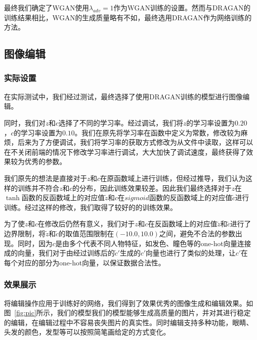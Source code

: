 \documentclass[a4paper,12pt,UTF8]{ctexart}
\begin{document}
最终我们确定了WGAN使用$\lambda_{adv}=1$作为WGAN训练的设置。然而与DRAGAN的训练结果相比，WGAN的生成质量略有不如，最终选用DRAGAN作为网络训练的方法。

\subsection{图像编辑}

\subsubsection{实际设置}

在实际测试中，我们经过测试，最终选择了使用DRAGAN训练的模型进行图像编辑。

同时，我们对$z$和$c$选择了不同的学习率。经过调试，我们将$z$的学习率设置为$0.20$，$c$的学习率设置为$0.10$。我们在原先将学习率在函数中定义为常数，修改较为麻烦，后来为了方便调试，我们将学习率的获取方式修改为从文件中读取，这样可以在不关闭前端的情况下修改学习率进行调试，大大加快了调试速度，最终获得了效果较为优秀的参数。

我们原先的想法是直接对于$z$和$c$在原函数域上进行训练，但经过推导，我们认为这样的训练并不符合$z$和$c$的分布，因此训练效果较差。因此我们最终选择对于$z$在$\tanh$函数的反函数域上的对应值$\tilde z$和$c$在$sigmoid$函数的反函数域上的对应值$\tilde c$进行训练。经过这样的修改，我们取得了较好的的训练效果。

为了使$z$和$c$在修改后仍然有意义，我们对于$z$和$c$在反函数域上的对应值$\tilde z$和$\tilde c$进行了边界限制，将$\tilde z$和$\tilde c$的取值范围限制在$(-10.0, 10.0)$之间，避免不合法的参数出现。同时，因为$c$是由多个代表不同人物特征，如发色、瞳色等的one-hot向量连接成的向量，我们对于由经过训练后的$\tilde c'$生成的$c'$向量也进行了类似的处理，让$c'$在每个对应的部分为one-hot向量，以保证数据合法性。

\subsubsection{效果展示}

将编辑操作应用于训练好的网络，我们得到了效果优秀的图像生成和编辑效果。如图~\ref{fig:pic}所示，我们的模型我们的模型能够生成高质量的图片，并对其进行稳定的编辑，在编辑过程中不容易丧失图片的真实性。同时编辑支持多种功能，眼睛、头发的颜色，发型等可以按照简笔画给定的方式变化。
\end{document}
